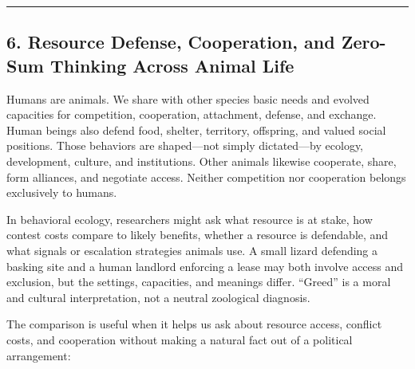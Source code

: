 \documentclass[
  11pt,
  letterpaper,
]{article}
\begin{document}
\begin{center}\rule{0.5\linewidth}{0.5pt}\end{center}

\subsection{6. Resource Defense, Cooperation, and Zero-Sum Thinking
Across Animal
Life}\label{resource-defense-cooperation-and-zero-sum-thinking-across-animal-life}

Humans are animals. We share with other species basic needs and evolved
capacities for competition, cooperation, attachment, defense, and
exchange. Human beings also defend food, shelter, territory, offspring,
and valued social positions. Those behaviors are shaped---not simply
dictated---by ecology, development, culture, and institutions. Other
animals likewise cooperate, share, form alliances, and negotiate access.
Neither competition nor cooperation belongs exclusively to humans.

In behavioral ecology, researchers might ask what resource is at stake,
how contest costs compare to likely benefits, whether a resource is
defendable, and what signals or escalation strategies animals use. A
small lizard defending a basking site and a human landlord enforcing a
lease may both involve access and exclusion, but the settings,
capacities, and meanings differ. ``Greed'' is a moral and cultural
interpretation, not a neutral zoological diagnosis.

The comparison is useful when it helps us ask about resource access,
conflict costs, and cooperation without making a natural fact out of a
political arrangement:
\end{document}
